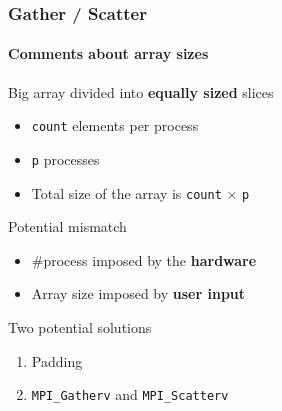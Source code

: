 \documentclass[xcolor={x11names,svgnames,psnames}]{beamer}
\begin{document}
\begin{frame}[fragile=singleslide]
  \frametitle{Gather / Scatter}
  \framesubtitle{Comments about array sizes}
  
  \begin{alertblock}{Big array divided into \textbf{equally sized} slices}
    \begin{itemize}
    \item \texttt{count} elements per process
    \item \texttt{p} processes
    \item Total size of the array is \texttt{count} $\times$ \texttt{p}
    \end{itemize}
  \end{alertblock}
  
  \begin{block}{Potential mismatch}
    \begin{itemize}
    \item \#process imposed by the \textbf{hardware}
    \item Array size imposed by \textbf{user input}
    \end{itemize}
  \end{block}
  
  \begin{exampleblock}{Two potential solutions}
    \begin{enumerate}
    \item Padding
    \item \texttt{MPI_Gatherv} and \texttt{MPI_Scatterv}
    \end{enumerate}
  \end{exampleblock}
\end{frame}


\end{document}
